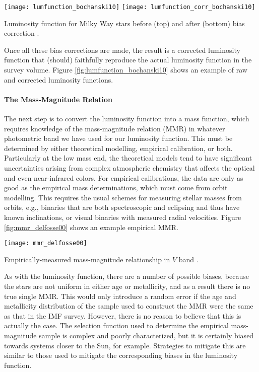 \begin{marginfigure}
\texttt{[image: lumfunction\_bochanski10]}
\texttt{[image: lumfunction\_corr\_bochanski10]}
\caption[Color-magnitude diagram of nearby stars]{
\label{fig:lumfunction_bochanski10}
Luminosity function for Milky Way stars before (top) and after (bottom) bias correction \citep{bochanski10a}.
}
\end{marginfigure}

Once all these bias corrections are made, the result is a corrected luminosity function that (should) faithfully reproduce the actual luminosity function in the survey volume. Figure \ref{fig:lumfunction_bochanski10} shows an example of raw and corrected luminosity functions.


\paragraph{The Mass-Magnitude Relation}

The next step is to convert the luminosity function into a mass function, which requires knowledge of the mass-magnitude relation (MMR) in whatever photometric band we have used for our luminosity function. This must be determined by either theoretical modelling, empirical calibration, or both. Particularly at the low mass end, the theoretical models tend to have significant uncertainties arising from complex atmospheric chemistry that affects the optical and even near-infrared colors. 
For empirical calibrations, the data are only as good as the empirical mass determinations, which must come from orbit modelling. This requires the usual schemes for measuring stellar masses from orbits, e.g., binaries that are both spectroscopic and eclipsing and thus have known inclinations, or visual binaries with measured radial velocities. Figure \ref{fig:mmr_delfosse00} shows an example empirical MMR.

\begin{marginfigure}
\texttt{[image: mmr\_delfosse00]}
\caption[Mass-magnitude relationship]{
\label{fig:mmr_delfosse00}
Empirically-measured mass-magnitude relationship in $V$ band \citep{delfosse00a}.
}
\end{marginfigure}

As with the luminosity function, there are a number of possible biases, because the stars are not uniform in either age or metallicity, and as a result there is no true single MMR. This would only introduce a random error if the age and metallicity distribution of the sample used to construct the MMR were the same as that in the IMF survey. However, there is no reason to believe that this is actually the case. The selection function used to determine the empirical mass-magnitude sample is complex and poorly characterized, but it is certainly biased towards systems closer to the Sun, for example. Strategies to mitigate this are similar to those used to mitigate the corresponding biases in the luminosity function.

